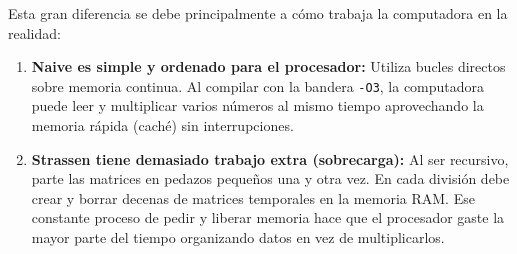 Esta gran diferencia se debe principalmente a cómo trabaja la computadora en la realidad:
\begin{enumerate}[leftmargin=1.5em, itemsep=1pt]
    \item \textbf{Naive es simple y ordenado para el procesador:} Utiliza bucles directos sobre memoria continua. Al compilar con la bandera \texttt{-O3}, la computadora puede leer y multiplicar varios números al mismo tiempo aprovechando la memoria rápida (caché) sin interrupciones.
    \item \textbf{Strassen tiene demasiado trabajo extra (sobrecarga):} Al ser recursivo, parte las matrices en pedazos pequeños una y otra vez. En cada división debe crear y borrar decenas de matrices temporales en la memoria RAM. Ese constante proceso de pedir y liberar memoria hace que el procesador gaste la mayor parte del tiempo organizando datos en vez de multiplicarlos.
\end{enumerate}